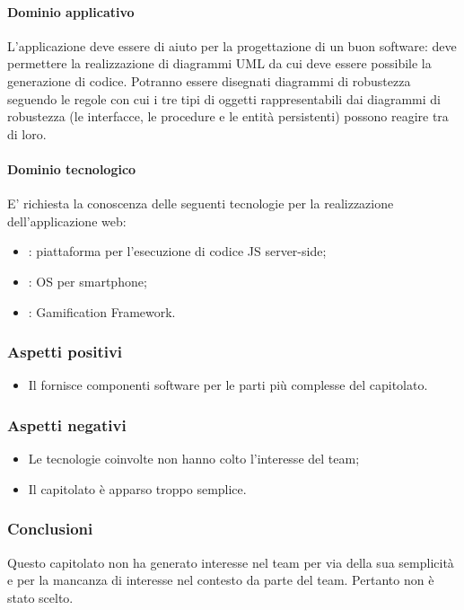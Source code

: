 			\paragraph{Dominio applicativo} 
			L'applicazione deve essere di aiuto per la progettazione di un buon software: deve permettere la realizzazione di diagrammi UML da cui deve essere possibile la generazione di codice. Potranno essere disegnati diagrammi di robustezza seguendo le regole con cui i tre tipi di oggetti rappresentabili dai diagrammi di robustezza (le interfacce, le procedure e le entità persistenti) possono reagire tra di loro.
			\paragraph{Dominio tecnologico} 
			E' richiesta la conoscenza delle seguenti tecnologie per la realizzazione dell'applicazione web:
				\begin{itemize}
					\item \textbf{}: piattaforma per l'esecuzione di codice JS server-side;
					\item \textbf{}: OS per smartphone;
					\item \textbf{}: Gamification Framework.
				\end{itemize}
		\subsubsection{Aspetti positivi}
		\begin{itemize}
			\item Il  fornisce componenti software per le parti più complesse del capitolato.
		\end{itemize}
		\subsubsection{Aspetti negativi}
		\begin{itemize}
			\item Le tecnologie coinvolte non hanno colto l'interesse del team;
			\item Il capitolato è apparso troppo semplice.
		\end{itemize}
		\subsubsection{Conclusioni}
		Questo capitolato non ha generato interesse nel team per via della sua semplicità e per la mancanza di interesse nel contesto da parte del team. Pertanto non è stato scelto.
		
